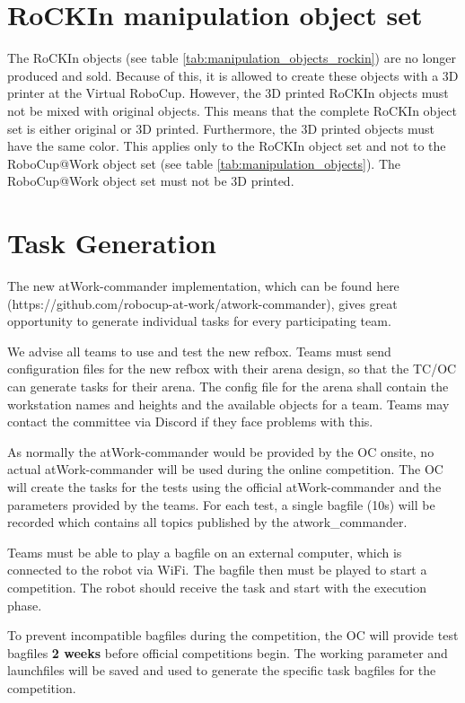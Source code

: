 \section{RoCKIn manipulation object set} 
\label{sec:VRCRoCKInSet}
The RoCKIn objects (see table \ref{tab:manipulation_objects_rockin}) are no longer produced and sold. Because of this, it is allowed to create these objects with a 3D printer at the Virtual RoboCup. However, the 3D printed RoCKIn objects must not be mixed with original objects. This means that the complete RoCKIn object set is either original or 3D printed. Furthermore, the 3D printed objects must have the same color. This applies only to the RoCKIn object set and not to the RoboCup@Work object set (see table \ref{tab:manipulation_objects}). The RoboCup@Work object set must not be 3D printed.


\section{Task Generation} 
\label{sec:VRCTaskGen}

The new atWork-commander implementation, which can be found here (https://github.com/robocup-at-work/atwork-commander), 
gives great opportunity to generate individual tasks for every participating team.

We advise all teams to use and test the new refbox. Teams must send configuration files for the new refbox with their arena design, so that the TC/OC can generate tasks for their arena. The config file for the arena shall contain the workstation names and heights and the available objects for a team. Teams may contact the committee via Discord if they face problems with this.  

As normally the atWork-commander would be provided by the OC onsite, no actual atWork-commander will be used during the online competition.
The OC will create the tasks for the tests using the official atWork-commander and the parameters provided by the teams. 
For each test, a single bagfile (10s) will be recorded which contains all topics published by the atwork\_commander.

Teams must be able to play a bagfile on an external computer, which is connected to the robot via WiFi.
The bagfile then must be played to start a competition. The robot should receive the task and start with the execution phase.

To prevent incompatible bagfiles during the competition, 
the OC will provide test bagfiles \textbf{2 weeks} before official competitions begin.
The working parameter and launchfiles will be saved and used to generate the specific task bagfiles for the competition.

